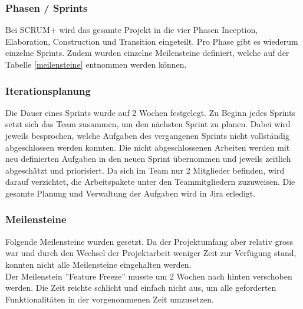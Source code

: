 \subsubsection*{Phasen / Sprints}
Bei SCRUM+ wird das gesamte Projekt in die vier Phasen Inception, Elaboration, Construction und Transition eingeteilt. Pro Phase gibt es wiederum einzelne Sprints. Zudem wurden einzelne Meilensteine definiert, welche auf der Tabelle \ref{meilensteine} entnommen werden können.

\newpage

\subsubsection*{Iterationsplanung}
Die Dauer eines Sprints wurde auf 2 Wochen festgelegt. Zu Beginn jedes Sprints setzt sich das Team zusammen, um den nächsten Sprint zu planen. Dabei wird jeweils besprochen, welche Aufgaben des vergangenen Sprints nicht vollständig abgeschlossen werden konnten. Die nicht abgeschlossenen Arbeiten werden mit neu definierten Aufgaben in den neuen Sprint übernommen und jeweils zeitlich abgeschätzt und priorisiert. Da sich im Team nur 2 Mitglieder befinden, wird darauf verzichtet, die Arbeitspakete unter den Teammitgliedern  zuzuweisen. Die gesamte Planung und Verwaltung der Aufgaben wird in Jira erledigt.


\subsubsection*{Meilensteine}
Folgende Meilensteine wurden gesetzt. Da der Projektumfang aber relativ gross war und durch den Wechsel der Projektarbeit weniger Zeit zur Verfügung stand, konnten nicht alle Meilensteine eingehalten werden. \\
Der Meilenstein ''Feature Freeze'' musste um 2 Wochen nach hinten verschoben werden. Die Zeit reichte schlicht und einfach nicht aus, um alle geforderten Funktionalitäten in der vorgenommenen Zeit umzusetzen. 


